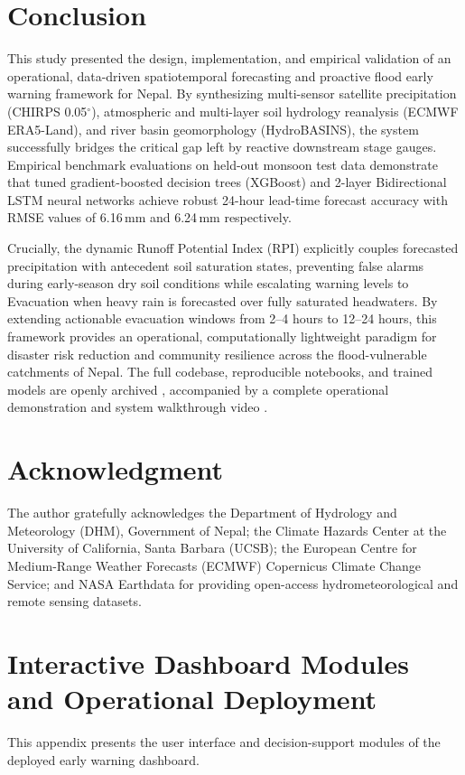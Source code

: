 \documentclass[journal]{IEEEtran}
\begin{document}
\section{Conclusion}
This study presented the design, implementation, and empirical validation of an operational, data-driven spatiotemporal forecasting and proactive flood early warning framework for Nepal. By synthesizing multi-sensor satellite precipitation (CHIRPS 0.05$^\circ$), atmospheric and multi-layer soil hydrology reanalysis (ECMWF ERA5-Land), and river basin geomorphology (HydroBASINS), the system successfully bridges the critical gap left by reactive downstream stage gauges. Empirical benchmark evaluations on held-out monsoon test data demonstrate that tuned gradient-boosted decision trees (XGBoost) and 2-layer Bidirectional LSTM neural networks achieve robust 24-hour lead-time forecast accuracy with RMSE values of 6.16\,mm and 6.24\,mm respectively. 

Crucially, the dynamic Runoff Potential Index (RPI) explicitly couples forecasted precipitation with antecedent soil saturation states, preventing false alarms during early-season dry soil conditions while escalating warning levels to Evacuation when heavy rain is forecasted over fully saturated headwaters. By extending actionable evacuation windows from 2--4 hours to 12--24 hours, this framework provides an operational, computationally lightweight paradigm for disaster risk reduction and community resilience across the flood-vulnerable catchments of Nepal. The full codebase, reproducible notebooks, and trained models are openly archived \cite{project_repository2026}, accompanied by a complete operational demonstration and system walkthrough video \cite{project_video2026}.

\section*{Acknowledgment}
The author gratefully acknowledges the Department of Hydrology and Meteorology (DHM), Government of Nepal; the Climate Hazards Center at the University of California, Santa Barbara (UCSB); the European Centre for Medium-Range Weather Forecasts (ECMWF) Copernicus Climate Change Service; and NASA Earthdata for providing open-access hydrometeorological and remote sensing datasets.




\appendices

\section{Interactive Dashboard Modules and Operational Deployment}
This appendix presents the user interface and decision-support modules of the deployed early warning dashboard.
\end{document}

